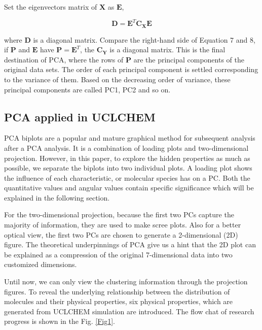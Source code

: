 \documentclass{aa}
\begin{document}
\begin{CJK*}{UTF8}{gbsn}
  Set the eigenvectors matrix of $\textbf{X}$ as $\textbf{E}$, 
  
  \begin{equation}
       \textbf{D} = \textbf{E}^{T}\textbf{C}_{\textbf{X}}\textbf{E}
   \end{equation}
  
  where $\textbf{D}$ is a diagonal matrix. Compare the right-hand side of Equation 7 and 8, if $\textbf{P}$ and $\textbf{E}$ 
  have $\textbf{P}=\textbf{E}^{T}$, the $\textbf{C}_{\textbf{Y}}$ is a diagonal matrix. This is the final destination of PCA, where the rows of $\textbf{P}$ are the principal components of the original data sets. The order of each principal component is settled corresponding to the variance of them. Based on the 
  decreasing order of variance, these principal components are called PC1, PC2 and so on. 
  
 
  \subsection{PCA applied in UCLCHEM}
  
  PCA biplots are a popular and mature graphical method for subsequent analysis after a PCA analysis. 
  It is a combination of loading plots and two-dimensional projection. However, in this paper, to explore the hidden properties as much as possible, we separate the biplots into two individual plots. A loading plot shows the influence of each characteristic, or molecular species has on a PC. Both the quantitative values and angular values contain specific significance which will be explained in the following section. 
  
   For the two-dimensional projection, because the first two PCs capture the majority of information, they are used to make scree plots. Also for a better optical view, the first two PCs are chosen to generate a 2-dimensional (2D) figure. The theoretical underpinnings of PCA give us a hint that the 2D plot can be explained as a compression of the original 7-dimensional data into two customized dimensions. 
 
   Until now, we can only view the clustering information through the projection figures. To reveal the underlying 
   relationship between the distribution of molecules and their physical properties, six physical properties, which are 
   generated from UCLCHEM simulation are introduced. The flow chat of research progress is shown in the Fig. \ref{Fig1}. 
  

\end{CJK*}
\end{document}
